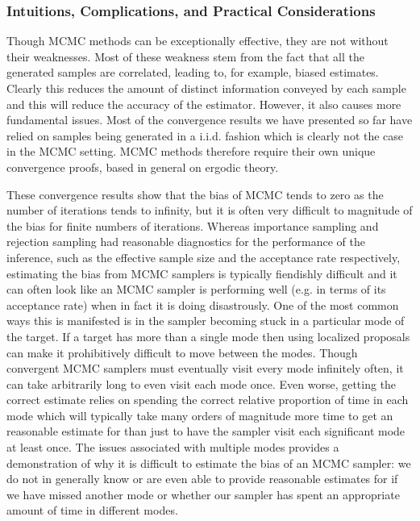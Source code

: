 \subsubsection{Intuitions, Complications, and Practical Considerations}
\label{sec:inf:foundation:mcmc:intuitions}

Though MCMC methods can be exceptionally effective, they are not without their weaknesses.
Most of these weakness stem from the fact that all the generated samples are correlated, leading to, for
example, biased estimates.  Clearly this reduces the amount of distinct information conveyed by 
each sample and this will reduce the accuracy of the estimator.  However, it also causes more fundamental
issues.
Most of the convergence results we have presented so far have relied on samples being generated in a i.i.d. 
fashion which is clearly not the case in the MCMC setting.  MCMC methods therefore require their own
unique convergence proofs, based in general on ergodic theory.

These convergence results show that the bias of MCMC tends to zero
as the number of iterations tends to infinity, but it is often very difficult to magnitude of the bias for
finite numbers of iterations.  Whereas importance sampling and rejection sampling had reasonable
diagnostics for the performance of the inference, such as the effective sample size and the acceptance
rate respectively, estimating the bias from MCMC samplers is typically fiendishly difficult and it can
often look like an MCMC sampler is performing well (e.g. in terms of its acceptance rate) when in fact it is doing disastrously.  
One of the most common ways this is manifested is in the sampler becoming stuck in a particular 
mode of the target.  If a target has more than a single mode then using localized proposals can make
it prohibitively difficult to move between the modes.  Though convergent MCMC samplers must eventually
visit every mode infinitely often, it can take arbitrarily long to even visit each mode once.  Even worse,
getting the correct estimate relies on spending the correct relative proportion of time in each mode which
will typically take many orders of magnitude more time to get an reasonable estimate for than just to
have the sampler visit each significant mode at least once.  The issues associated with multiple modes
provides a demonstration of why it is difficult to estimate the bias of an MCMC sampler: we do not in
generally know or are even able to provide reasonable estimates for if we have missed another mode or 
whether our sampler has spent an appropriate amount of time in different modes.

